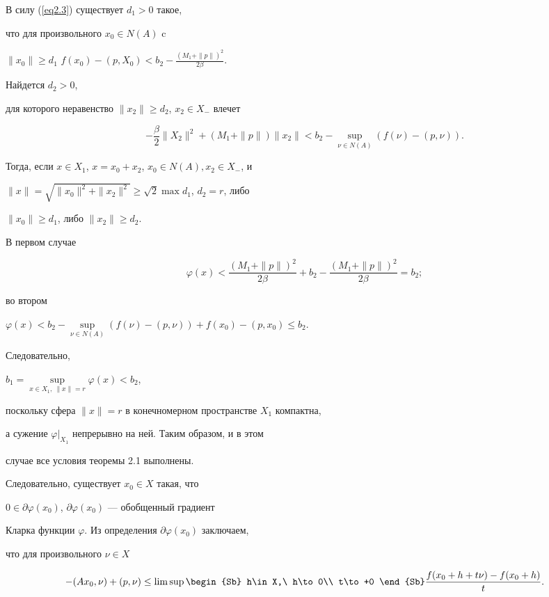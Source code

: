 В силу (\ref{eq2.3}) существует $d_1>0$ такое,


что для произвольного $x_0\in N(A)$ c


$\|x_0\|\ge d_1$\;  $f(x_0)-(p,X_0)<b_2-\frac{(M_1+\| p\|)^2}{2\beta}$.


Найдется $d_2>0$,


для которого неравенство $\|x_2\|\ge d_2$, $x_2\in X_-$ влечет


$$


-\frac{\beta}{2}\| X_2\|^2+(M_1+\| p\|)\| x_2\|<b_2-


\sup\limits_{\nu\in N(A)}(f(\nu )-(p,\nu )).


$$


Тогда, если $x\in X_1$, $x=x_0+x_2$, $x_0\in N(A), x_2\in X_-$, и


$\| x\| =\sqrt{\| x_0\| ^2+\| x_2\| ^2}\ge\sqrt{2}\max d_1$, $d_2=r$, либо


$\| x_0\|\ge d_1$, либо $\| x_2\|\ge d_2$.


В первом случае


$$\varphi (x)


<\frac{(M_1+\| p\|)^2}{2\beta}+b_2-\frac{(M_1+\| p\|)^2}{2\beta}=b_2;


$$


во втором


$\varphi (x)<b_2-\sup\limits_{\nu\in N(A)}(f(\nu )-(p,\nu ))+f(x_0)-(p,x_0)


\le b_2$.





Следовательно,


$b_1=\sup\limits_{x\in X_1,\ \| x\| =r}\varphi (x)<b_2$,


поскольку сфера $\| x\| =r$ в конечномерном пространстве $X_1$ компактна,


а сужение $\varphi|_{X_1}$ непрерывно на ней. Таким образом, и в этом


случае все условия теоремы 2.1 выполнены.





Следовательно, существует $x_0\in X$ такая, что


$0\in\partial\varphi (x_0)$, $\partial\varphi (x_0)$ --- обобщенный градиент


Кларка функции $\varphi $. Из определения $\partial\varphi (x_0)$ заключаем,


что для произвольного $\nu\in X$


\begin{equation}


-(Ax_0,\nu )+(p,\nu )\le


\limsup\limits\begin{Sb} h\in X,\ h\to 0\\ t\to +0 \end{Sb}


\frac{f(x_0+h+t\nu )-f(x_0+h)}{t}.


\label{eq2.4}


\end{equation}


